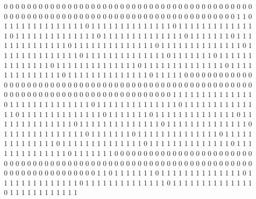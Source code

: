 0 0 0 0 0 0 0 0 0 0 0 0 0 0 0 0 0 0 0 0 0 0 0 0 0 0 0 0 0 0 0 0 0 0 0 0 0 0 0 0 0 0 0 0 0 0 0 0 0 0 0 0 0 0 0 0 0 0 0 0 0 0 0 0 0 0 0 0 0 0 0 0 0 0 0 0 0 0 0 0 0 0 0 
1 1 0 1 1 1 1 1 1 1 1 1 1 1 1 1 1 0 1 1 1 1 1 1 1 1 1 1 1 1 1 1 0 1 1 1 1 1 1 1 1 1 1 1 1 1 1 0 1 1 1 1 1 1 1 1 1 1 1 1 1 1 0 1 1 1 1 1 1 1 1 1 1 1 1 1 1 0 1 1 1 1 1 
1 1 0 1 1 1 1 1 1 1 1 1 1 1 1 1 1 0 1 1 1 1 1 1 1 1 1 1 1 1 1 1 0 1 1 1 1 1 1 1 1 1 1 1 1 1 1 0 1 1 1 1 1 1 1 1 1 1 1 1 1 1 0 1 1 1 1 1 1 1 1 1 1 1 1 1 1 0 1 1 1 1 1 
1 1 0 1 1 1 1 1 1 1 1 1 1 1 1 1 1 0 1 1 1 1 1 1 1 1 1 1 1 1 1 1 0 1 1 1 1 1 1 1 1 1 1 1 1 1 1 0 1 1 1 1 1 1 1 1 1 1 1 1 1 1 0 1 1 1 1 1 1 1 1 1 1 1 1 1 1 0 1 1 1 1 1 
0 0 0 0 0 0 0 0 0 0 0 0 0 0 0 0 0 0 0 0 0 0 0 0 0 0 0 0 0 0 0 0 0 0 0 0 0 0 0 0 0 0 0 0 0 0 0 0 0 0 0 0 0 0 0 0 0 0 0 0 0 0 0 0 0 0 0 0 0 0 0 0 0 0 0 0 0 0 0 0 0 0 0 
0 1 1 1 1 1 1 1 1 1 1 1 1 1 1 0 1 1 1 1 1 1 1 1 1 1 1 1 1 1 0 1 1 1 1 1 1 1 1 1 1 1 1 1 1 0 1 1 1 1 1 1 1 1 1 1 1 1 1 1 0 1 1 1 1 1 1 1 1 1 1 1 1 1 1 0 1 1 1 1 1 1 1 
0 1 1 1 1 1 1 1 1 1 1 1 1 1 1 0 1 1 1 1 1 1 1 1 1 1 1 1 1 1 0 1 1 1 1 1 1 1 1 1 1 1 1 1 1 0 1 1 1 1 1 1 1 1 1 1 1 1 1 1 0 1 1 1 1 1 1 1 1 1 1 1 1 1 1 0 1 1 1 1 1 1 1 
0 1 1 1 1 1 1 1 1 1 1 1 1 1 1 0 1 1 1 1 1 1 1 1 1 1 1 1 1 1 0 1 1 1 1 1 1 1 1 1 1 1 1 1 1 0 1 1 1 1 1 1 1 1 1 1 1 1 1 1 0 1 1 1 1 1 1 1 1 1 1 1 1 1 1 0 1 1 1 1 1 1 1 
0 0 0 0 0 0 0 0 0 0 0 0 0 0 0 0 0 0 0 0 0 0 0 0 0 0 0 0 0 0 0 0 0 0 0 0 0 0 0 0 0 0 0 0 0 0 0 0 0 0 0 0 0 0 0 0 0 0 0 0 0 0 0 0 0 0 0 0 0 0 0 0 0 0 0 0 0 0 0 0 0 0 0 
1 1 0 1 1 1 1 1 1 1 0 1 1 1 1 1 1 1 1 1 1 1 1 1 1 0 1 1 1 1 1 1 1 1 1 1 1 1 1 1 0 1 1 1 1 1 1 1 1 1 1 1 1 1 1 0 1 1 1 1 1 1 1 1 1 1 1 1 1 1 0 1 1 1 1 1 1 1 1 1 1 1 1 
